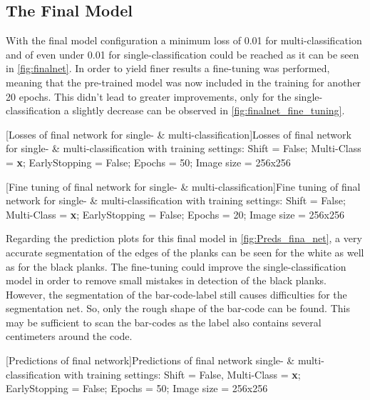 \subsection{The Final Model}
With the final model configuration a minimum loss of 0.01 for multi-classification and of even under 0.01 for single-classification could be reached as it can be seen in \cref{fig:finalnet}. In order to yield finer results a fine-tuning was performed, meaning that the pre-trained model was now included in the training for another 20 epochs. This didn't lead to greater improvements, only for the single-classification a slightly decrease can be observed in \cref{fig:finalnet_fine_tuning}.\\
\begin{minipage}{\textwidth}
	
	[Losses of final network for single- \& multi-classification]{Losses of final network for single- \& multi-classification with training settings: Shift = False; Multi-Class = \textbf{x}; EarlyStopping = False; Epochs = 50; Image size = 256x256}
	\label{fig:finalnet}
	\vspace{5mm}
\end{minipage}
\begin{minipage}{\textwidth}
	
	[Fine tuning of final network for single- \& multi-classification]{Fine tuning of final network for single- \& multi-classification with training settings: Shift = False; Multi-Class = \textbf{x}; EarlyStopping = False; Epochs = 20; Image size = 256x256}
	\label{fig:finalnet_fine_tuning}
	\vspace{5mm}
\end{minipage}
Regarding the prediction plots for this final model in \cref{fig:Preds_fina_net}, a very accurate segmentation of the edges of the planks can be seen for the white as well as for the black planks. The fine-tuning could improve the single-classification model in order to remove small mistakes in detection of the black planks.\\
However, the segmentation of the bar-code-label still causes difficulties for the segmentation net. So, only the rough shape of the bar-code can be found. This may be sufficient to scan the bar-codes as the label also contains several centimeters around the code.\\
\begin{minipage}{\textwidth}
    \hspace{0.2cm}
	[Predictions of final network]{Predictions of final network single- \& multi-classification with training settings: Shift = False, Multi-Class = \textbf{x}; EarlyStopping = False; Epochs = 50; Image size = 256x256}
	\label{fig:Preds_fina_net}
	\vspace{5mm}
\end{minipage}


